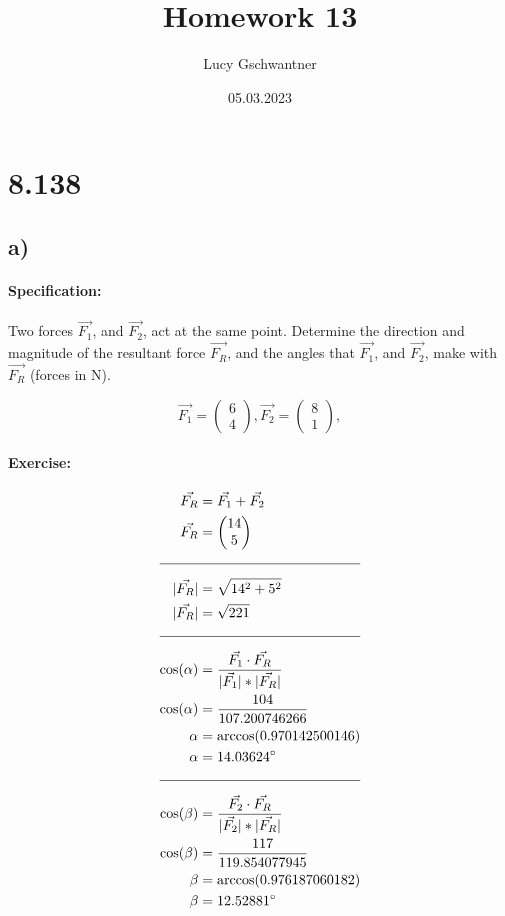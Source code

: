 \documentclass{article}
\title{Homework 13}
\author{Lucy Gschwantner}
\date{05.03.2023}
\begin{document}
\maketitle 
\pagebreak
\tableofcontents
\pagebreak

\section{8.138}
\subsection{a)}
\paragraph{Specification:}

Two forces $\vec{F_1}$, and $\vec{F_2}$, act at the same point. Determine the direction and
magnitude of the resultant force $\vec{F_R}$, and the angles that $\vec{F_1}$, and $\vec{F_2}$, 
make with $\vec{F_R}$ (forces in N).

\begin{equation}
   \vec{F_1} = \begin{pmatrix}
       6 \\ 
       4
   \end{pmatrix}, \vec{F_2} = \begin{pmatrix}
       8 \\ 
       1
   \end{pmatrix}, 
\end{equation}

\paragraph{Exercise:}

\begin{align}
    \vec{F_R} &= \vec{F_1} + \vec{F_2} \\ 
    \vec{F_R} &= \begin{pmatrix}
    14 \\ 
    5
    \end{pmatrix} \\[10pt]
    \hline
    \noalign{\vskip 10pt}
    |\vec{F_R}| &= \sqrt{14^2 + 5^2} \\
    |\vec{F_R}| &= \sqrt{221} \\[10pt]
    \hline
    \noalign{\vskip 10pt}
    \cos(\alpha) &= \frac{\vec{F_1} \cdot \vec{F_R}}{|\vec{F_1}| * |\vec{F_R}|} \\
    \cos(\alpha) &= \frac{104}{107.200746266} \\
    \alpha &= \arccos(0.970142500146) \\
    \alpha &= 14.03624^\circ \\[10pt]
    \hline
    \noalign{\vskip 10pt}
    \cos(\beta) &= \frac{\vec{F_2} \cdot \vec{F_R}}{|\vec{F_2}| * |\vec{F_R}|} \\
    \cos(\beta) &= \frac{117}{119.854077945} \\
    \beta &= \arccos(0.976187060182) \\
    \beta &= 12.52881^\circ
\end{align}
\end{document}
